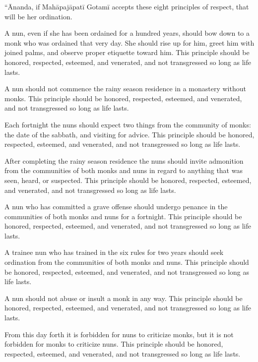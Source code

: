 \documentclass[12pt,openany]{book}%
\begin{document}
“Ānanda, if \textsanskrit{Mahāpajāpatī} \textsanskrit{Gotamī} accepts these eight principles of respect, that will be her ordination. 

A nun, even if she has been ordained for a hundred years, should bow down to a monk who was ordained that very day. She should rise up for him, greet him with joined palms, and observe proper etiquette toward him. This principle should be honored, respected, esteemed, and venerated, and not transgressed so long as life lasts. 

A nun should not commence the rainy season residence in a monastery without monks. This principle should be honored, respected, esteemed, and venerated, and not transgressed so long as life lasts. 

Each fortnight the nuns should expect two things from the community of monks: the date of the sabbath, and visiting for advice. This principle should be honored, respected, esteemed, and venerated, and not transgressed so long as life lasts. 

After completing the rainy season residence the nuns should invite admonition from the communities of both monks and nuns in regard to anything that was seen, heard, or suspected. This principle should be honored, respected, esteemed, and venerated, and not transgressed so long as life lasts. 

A nun who has committed a grave offense should undergo penance in the communities of both monks and nuns for a fortnight. This principle should be honored, respected, esteemed, and venerated, and not transgressed so long as life lasts. 

A trainee nun who has trained in the six rules for two years should seek ordination from the communities of both monks and nuns. This principle should be honored, respected, esteemed, and venerated, and not transgressed so long as life lasts. 

A nun should not abuse or insult a monk in any way. This principle should be honored, respected, esteemed, and venerated, and not transgressed so long as life lasts. 

From this day forth it is forbidden for nuns to criticize monks, but it is not forbidden for monks to criticize nuns. This principle should be honored, respected, esteemed, and venerated, and not transgressed so long as life lasts. 
\end{document}
